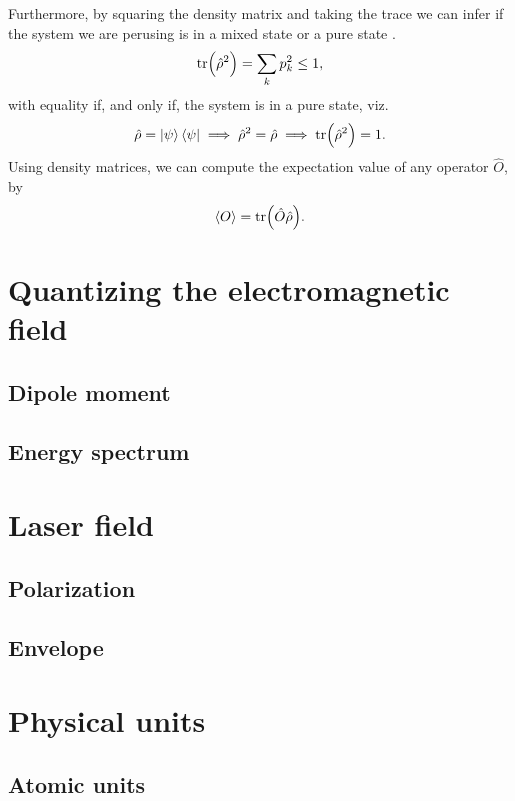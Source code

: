         Furthermore, by squaring the density matrix and taking the trace we can
        infer if the system we are perusing is in a mixed state or a pure state
        \cite{modern-qm}.
        \begin{align}
            \tr(\hat{\rho}^2) = \sum_{k} p_k^2 \leq 1,
        \end{align}
        with equality if, and only if, the system is in a pure state, viz.
        \begin{align}
            \hat{\rho} = \ket{\psi}\bra{\psi}
            \implies \hat{\rho}^2 = \hat{\rho}
            \implies \tr(\hat{\rho}^2) = 1.
        \end{align}
        Using density matrices, we can compute the expectation value of any
        operator $\hat{O}$, by \cite{modern-qm}
        \begin{align}
            \left\langle O \right\rangle = \tr(\hat{O}\hat{\rho}).
        \end{align}

    \section{Quantizing the electromagnetic field}
        \subsection{Dipole moment}
        \subsection{Energy spectrum}

    \section{Laser field}
        \subsection{Polarization}
        \subsection{Envelope}

    \section{Physical units}
        \subsection{Atomic units}
